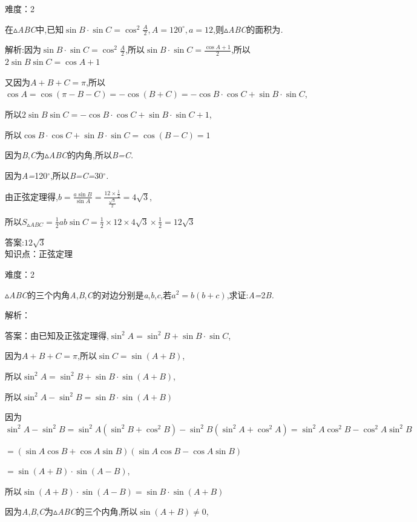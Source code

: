 \documentclass{article} %
\begin{document}
难度：2

 在$\mathrm{\vartriangle}$\textit{ABC}中,已知$\sin B\cdot \sin C=\cos^2 \frac{A}{2},A=120^{\circ},a=12$,则$\mathrm{\vartriangle}$\textit{ABC}的面积为\textit{\underbar{　　　　　}.~}

 解析:因为$\sin B\cdot \sin C=\cos^2 \frac{A}{2}$,所以$\sin B\cdot \sin C=\frac{\cos A+1}{2}$,所以$2\sin B\sin C=\cos A+1$

又因为$A+B+C=\pi$,所以$\cos A=\cos(\pi -B-C)=-\cos(B+C)=-\cos B\cdot \cos C+\sin B\cdot \sin C$,

所以$2\sin B\sin C=-\cos B\cdot \cos C+\sin B\cdot \sin C+1$,

所以$\cos B\cdot \cos C+\sin B\cdot \sin C=\cos(B-C)=1$

因为\textit{B},\textit{C}为$\mathrm{\vartriangle}$\textit{ABC}的内角,所以\textit{B=C.}

因为\textit{A=}120$\mathrm{{}^\circ}$,所以\textit{B=C=}30$\mathrm{{}^\circ}$\textit{.}

由正弦定理得,$b=\frac{a\sin B}{\sin A}=\frac{12\times \frac{1}{2}}{\frac{\sqrt{3}}{2}}=4\sqrt{3}$,

所以$S_{\vartriangle ABC}=\frac{1}{2}ab\sin C=\frac{1}{2}\times 12\times 4\sqrt{3}\times 
\frac{1}{2}=12\sqrt{3}$

 答案:$12\sqrt{3}$ \\

知识点：正弦定理

难度：2

 $\mathrm{\vartriangle}$\textit{ABC}的三个内角\textit{A},\textit{B},\textit{C}的对边分别是\textit{a},\textit{b},\textit{c},若$a^2=b(b+c)$,求证:\textit{A=}2\textit{B.}

解析：

 答案：由已知及正弦定理得,$\sin^2 A=\sin^2 B+\sin B\cdot \sin C$,

因为$A+B+C=\pi$,所以$\sin C=\sin (A+B)$,

所以$\sin^2 A=\sin^2 B+\sin B\cdot \sin(A+B)$,

所以$\sin^2 A-\sin^2 B=\sin B\cdot \sin(A+B)$

因为$\sin^2 A-\sin^2 B=\sin^2 A(\sin^2 B+\cos^2 B)-\sin^2 B(\sin^2 A+\cos^2 A)=\sin^2 A\cos^2 B-\cos^2 A\sin^2 B$

$=(\sin A\cos B+\cos A\sin B)(\sin A\cos B-\cos A\sin B)$

$=\sin(A+B)\cdot \sin (A-B)$,

所以$\sin(A+B)\cdot \sin(A-B)=\sin B\cdot \sin(A+B)$

因为\textit{A},\textit{B},\textit{C}为$\mathrm{\vartriangle}$\textit{ABC}的三个内角,所以$\sin(A+B)\ne 0$,
\end{document}
